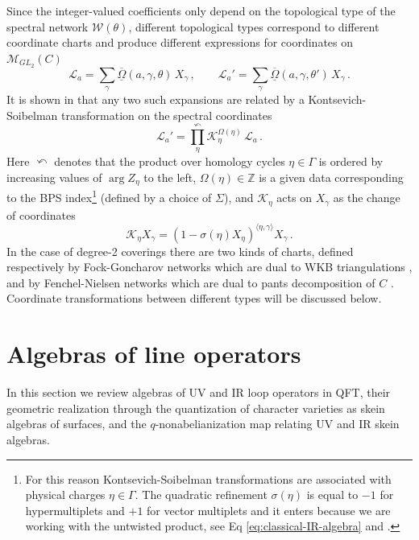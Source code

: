 \documentclass{article}
\numberwithin{equation}{section}
\newcommand{\IZ}{\mathbb{Z}}
\def\be{\begin{equation}}
\def\ee{\end{equation}}
\def\IZ{{\mathbb{Z}}}
\def\CL{\mathcal{L}}
\def\CM{{\mathcal{M}}}
\def\CW{{\mathcal{W}}}
\def\CW{\mathcal{W}}
\def\fY{\Gamma}
\def\fOmega{\overline{\underline{\Omega}}}
\begin{document}
Since the integer-valued coefficients only depend on the topological type of the spectral network $\CW(\theta)$, different topological types correspond to different coordinate charts and produce different expressions for coordinates on $\CM_{GL_2}(C)$
\be
	\CL_{a} = \sum_{\gamma} \fOmega(a,\gamma,\theta) \, X_{\gamma} \,,
	\qquad
	\CL_{a}' = \sum_{\gamma} \fOmega(a,\gamma,\theta') \, X_{\gamma}\,.
\ee
It is shown in \cite{Gaiotto:2012rg} that any two such expansions are related by a Kontsevich-Soibelman transformation on the spectral coordinates
\be
	\CL_{a}'  = \prod_{\eta}^{\curvearrowleft} \mathcal{K}_{\eta}^{\Omega(\eta)} \, \CL_{a}\,.
\ee
Here $\curvearrowleft$ denotes that the product over homology cycles $\eta\in \fY$  is ordered by increasing values of $\arg Z_\eta$ to the left, $\Omega(\eta)\in \IZ$ is a given data corresponding to the BPS index\footnote{For this reason Kontsevich-Soibelman transformations are associated with physical charges $\eta\in \fY$.
The quadratic refinement $\sigma(\eta)$ is equal to $-1$ for hypermultiplets and $+1$ for vector multiplets and it enters because we are working with the untwisted product, see Eq \eqref{eq:classical-IR-algebra} and \cite{Gaiotto:2009hg}.}
 (defined by a choice of $\Sigma$), and $\mathcal{K}_\eta$ acts on $X_\gamma$ as the change of coordinates \cite{Kontsevich:2008fj}
\begin{equation}\label{eq:KS-transformation}
    \mathcal{K}_\eta X_{\gamma} = (1-
    \sigma(\eta)X_\eta)^{\langle\eta,\gamma\rangle}X_{\gamma}\,.
\end{equation}
In the case of degree-2 coverings there are two kinds of charts, defined respectively by Fock-Goncharov networks which are dual to WKB triangulations \cite{Gaiotto:2009hg}, and by Fenchel-Nielsen networks which are dual to pants decomposition of $C$ \cite{Hollands:2013qza}. Coordinate transformations between different types will be discussed below.





\section{Algebras of line operators}\label{sec:algebra}


In this section we review algebras of UV and IR loop operators in QFT, their geometric realization through the quantization of character varieties as skein algebras of surfaces, and the $q$-nonabelianization map relating UV and IR skein algebras. 
\end{document}
